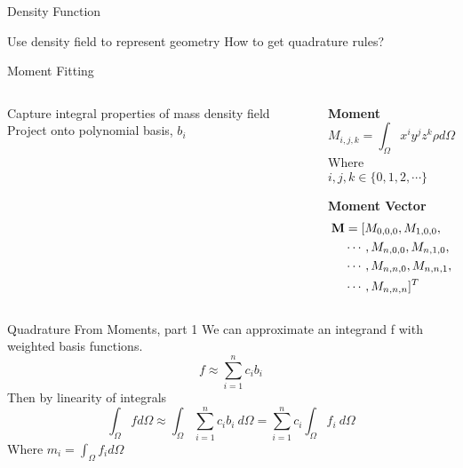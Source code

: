 \begin{frame}{Density Function}
\begin{outline}
  Use density field to represent geometry
  How to get quadrature rules?
\end{outline}
\end{frame}

\placelogofalse
\begin{frame}{Moment Fitting}
\begin{columns}
\begin{center}
\begin{outline}
\1 Capture integral properties of mass density field
\2 Project onto polynomial basis, $b_i$
\end{outline}
\end{center}

\begin{center}
  \textbf{Moment}
  $$
  M_{i,j,k} = \int_{\Omega} x^i y^j z^k \rho d\Omega
  $$
  Where $i, j, k \in \{0, 1, 2, \cdots\}$

  \vspace{1.5cm}

  \textbf{Moment Vector}
  \begin{align*}
    \bf{M} &= [M_{0,0,0}, M_{1, 0, 0},\\
      & \cdots, M_{n, 0, 0}, M_{n, 1, 0},\\
      & \cdots, M_{n, n, 0}, M_{n, n, 1},\\
      & \cdots, M_{n,n,n}]^T
  \end{align*}
\end{center}
\end{columns}
\end{frame}
\placelogotrue

\begin{frame}{Quadrature From Moments, part 1}
We can approximate an integrand f with weighted basis functions.
$$
f \approx \sum_{i = 1}^n c_i b_i
$$
Then by linearity of integrals
$$
\int_{\Omega} f d\Omega \approx \int_{\Omega} \sum_{i = 1}^n c_i b_i \ d \Omega
= \sum_{i=1}^n c_i \int_{\Omega} f_i \ d \Omega
$$
Where $m_i = \int_{\Omega} f_i d \Omega$
\end{frame}

